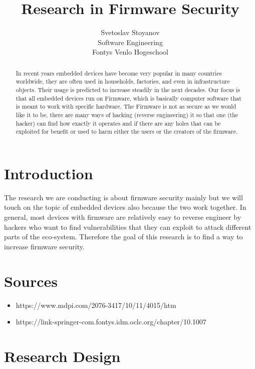 \documentclass[]{report}
\title{Research in Firmware Security}
\author{Svetoslav Stoyanov \\
	Software Engineering \\
	Fontys Venlo Hogeschool}
\begin{document}
\maketitle
\tableofcontents
\begin{abstract}
	In recent years embedded devices have become very popular in many countries worldwide, they are often used in households, factories, and even in infrastructure objects. Their usage is predicted to increase steadily in the next decades. Our focus is that all embedded devices run on Firmware, which is basically computer software that is meant to work with specific hardware. The Firmware is not as secure as we would like it to be, there are many ways of hacking (reverse engineering) it so that one (the hacker) can find how exactly it operates and if there are any holes that can be exploited for benefit or used to harm either the users or the creators of the firmware.
\end{abstract}
\section{Introduction}
The research we are conducting is about firmware security mainly but we will touch on the topic of embedded devices also because the two work together. In general, most devices with firmware are relatively easy to reverse engineer by hackers who want to find vulnerabilities that they can exploit to attack different parts of the eco-system. Therefore the goal of this research is to find a way to increase firmware security.
\section{Sources}
\begin{itemize}
	\item https://www.mdpi.com/2076-3417/10/11/4015/htm
	\item https://link-springer-com.fontys.idm.oclc.org/chapter/10.1007%
\end{itemize}


\section{Research Design}
\end{document}
